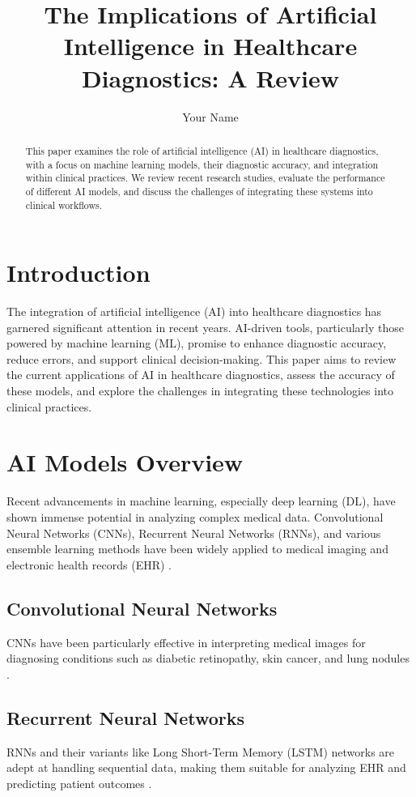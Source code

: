 \documentclass[12pt]{article}
\title{The Implications of Artificial Intelligence in Healthcare Diagnostics: A Review}
\author{Your Name}
\begin{document}
\maketitle

\begin{abstract}
This paper examines the role of artificial intelligence (AI) in healthcare diagnostics, with a focus on machine learning models, their diagnostic accuracy, and integration within clinical practices. We review recent research studies, evaluate the performance of different AI models, and discuss the challenges of integrating these systems into clinical workflows.
\end{abstract}

\section{Introduction}
The integration of artificial intelligence (AI) into healthcare diagnostics has garnered significant attention in recent years. AI-driven tools, particularly those powered by machine learning (ML), promise to enhance diagnostic accuracy, reduce errors, and support clinical decision-making. This paper aims to review the current applications of AI in healthcare diagnostics, assess the accuracy of these models, and explore the challenges in integrating these technologies into clinical practices.

\section{AI Models Overview}
Recent advancements in machine learning, especially deep learning (DL), have shown immense potential in analyzing complex medical data. Convolutional Neural Networks (CNNs), Recurrent Neural Networks (RNNs), and various ensemble learning methods have been widely applied to medical imaging and electronic health records (EHR) \cite{litjens2017survey, shickel2018deep}.

\subsection{Convolutional Neural Networks}
CNNs have been particularly effective in interpreting medical images for diagnosing conditions such as diabetic retinopathy, skin cancer, and lung nodules \cite{gulshan2016development, esteva2017dermatologist, ardila2019end}.

\subsection{Recurrent Neural Networks}
RNNs and their variants like Long Short-Term Memory (LSTM) networks are adept at handling sequential data, making them suitable for analyzing EHR and predicting patient outcomes \cite{choi2016doctor, rajkomar2018scalable}.
\end{document}
